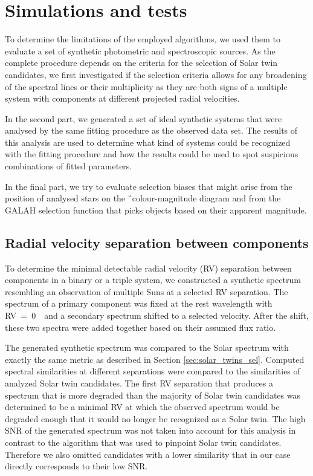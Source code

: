 \section{Simulations and tests}
\label{sec:simulations}
To determine the limitations of the employed algorithms, we used them to evaluate a set of synthetic photometric and spectroscopic sources. As the complete procedure depends on the criteria for the selection of Solar twin candidates, we first investigated if the selection criteria allows for any broadening of the spectral lines or their multiplicity as they are both signs of a multiple system with components at different projected radial velocities.

In the second part, we generated a set of ideal synthetic systems that were analysed by the same fitting procedure as the observed data set. The results of this analysis are used to determine what kind of systems could be recognized with the fitting procedure and how the results could be used to spot suspicious combinations of fitted parameters. 

In the final part, we try to evaluate selection biases that might arise from the position of analysed stars on the \G\ colour-magnitude diagram and from the GALAH selection function that picks objects based on their apparent magnitude.

\subsection{Radial velocity separation between components}
\label{sec:rv_sep_sim}
To determine the minimal detectable radial velocity (RV) separation between components in a binary or a triple system, we constructed a synthetic spectrum resembling an observation of multiple Suns at a selected RV separation. The spectrum of a primary component was fixed at the rest wavelength with RV~=~0~\kms\ and a secondary spectrum shifted to a selected velocity. After the shift, these two spectra were added together based on their assumed flux ratio. 

The generated synthetic spectrum was compared to the Solar spectrum with exactly the same metric as described in Section \ref{sec:solar_twins_sel}. Computed spectral similarities at different separations were compared to the similarities of analyzed Solar twin candidates. The first RV separation that produces a spectrum that is more degraded than the majority of Solar twin candidates was determined to be a minimal RV at which the observed spectrum would be degraded enough that it would no longer be recognized as a Solar twin. The high SNR of the generated spectrum was not taken into account for this analysis in contrast to the algorithm that was used to pinpoint Solar twin candidates. Therefore we also omitted candidates with a lower similarity that in our case directly corresponds to their low SNR. 

